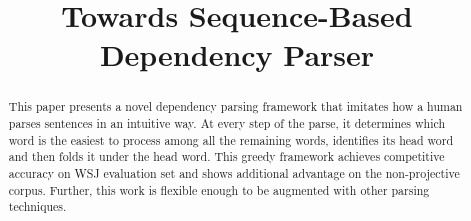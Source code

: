 \documentclass[11pt]{article}
\title{Towards Sequence-Based Dependency Parser}
\newcommand{\BF}[1]{\textcolor{red}{Bean: #1}}
\begin{document}
\maketitle
\begin{abstract}
This paper presents a novel dependency parsing framework that
imitates how a human parses sentences in an intuitive way.
At every step of the parse, it determines which word is the easiest to
process among all the remaining words, identifies its head word and then
folds it under the head word.
This greedy framework achieves competitive accuracy on WSJ evaluation set
and shows additional advantage on the non-projective corpus.
Further, this work is flexible enough to be augmented with other
parsing techniques.
\end{abstract}




%
%




%




\end{document}
